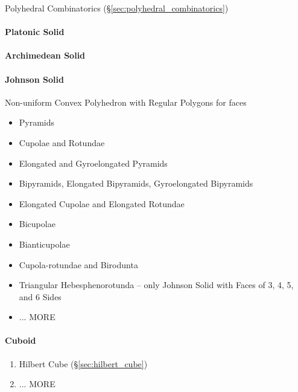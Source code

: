 \fist Polyhedral Combinatorics (\S\ref{sec:polyhedral_combinatorics})



\paragraph{Platonic Solid}\label{sec:platonic_solid}\hfill

\paragraph{Archimedean Solid}\label{sec:archimedean_solid}\hfill

\paragraph{Johnson Solid}\label{sec:johnson_solid}\hfill

Non-uniform Convex Polyhedron with Regular Polygons for faces

\begin{itemize}
  \item Pyramids
  \item Cupolae and Rotundae
  \item Elongated and Gyroelongated Pyramids
  \item Bipyramids, Elongated Bipyramids, Gyroelongated Bipyramids
  \item Elongated Cupolae and Elongated Rotundae
  \item Bicupolae
  \item Bianticupolae
  \item Cupola-rotundae and Birodunta
  \item Triangular Hebesphenorotunda -- only Johnson Solid with Faces of 3, 4,
    5, and 6 Sides
  \item ... MORE
\end{itemize}



\paragraph{Cuboid}\label{sec:cuboid}\hfill

\begin{enumerate}
  \item Hilbert Cube (\S\ref{sec:hilbert_cube})
  \item ... MORE
\end{enumerate}



